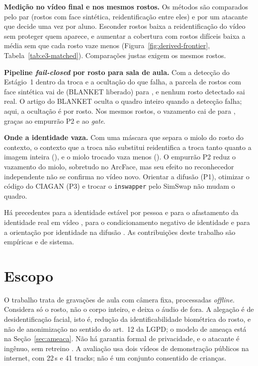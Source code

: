 \textbf{Medição no vídeo final e nos mesmos rostos.} Os métodos são comparados pelo par (rostos com face sintética, reidentificação entre eles) e por um atacante que decide uma vez por aluno. Esconder rostos baixa a reidentificação do vídeo sem proteger quem aparece, e aumentar a cobertura com rostos difíceis baixa a média sem que cada rosto vaze menos (Figura~\ref{fig:derived-frontier}, Tabela~\ref{tab:e3-matched}). Comparações justas exigem os mesmos rostos.

\textbf{Pipeline \emph{fail-closed} por rosto para sala de aula.} Com a detecção do Estágio~1 dentro da troca e a ocultação do que falha, a parcela de rostos com face sintética vai de  (BLANKET liberado) para , e nenhum rosto detectado sai real. O artigo do BLANKET oculta o quadro inteiro quando a detecção falha; aqui, a ocultação é por rosto. Nos mesmos rostos, o vazamento cai de  para , graças ao empurrão P2 e ao \emph{gate}.

\textbf{Onde a identidade vaza.} Com uma máscara que separa o miolo do rosto do contexto, o contexto que a troca não substitui reidentifica a troca tanto quanto a imagem inteira (), e o miolo trocado vaza menos (). O empurrão P2 reduz o vazamento do miolo, sobretudo no ArcFace, mas seu efeito no reconhecedor independente não se confirma no vídeo novo. Orientar a difusão (P1), otimizar o código do CIAGAN (P3) e trocar o \texttt{inswapper} pelo SimSwap não mudam o quadro.

Há precedentes para a identidade estável por pessoa e para o afastamento da identidade real em vídeo \citep{fiva}, para o condicionamento negativo de identidade \citep{nullface,kung,revpers} e para a orientação por identidade na difusão \citep{diffprivacy}. As contribuições deste trabalho são empíricas e de sistema.

\section{Escopo}

O trabalho trata de gravações de aula com câmera fixa, processadas \emph{offline}. Considera só o rosto, não o corpo inteiro, e deixa o áudio de fora. A alegação é de desidentificação facial, isto é, redução da identificabilidade biométrica do rosto, e não de anonimização no sentido do art.~12 da LGPD; o modelo de ameaça está na Seção~\ref{sec:ameaca}. Não há garantia formal de privacidade, e o atacante é ingênuo, sem retreino \citep{hanisch}. A avaliação usa dois vídeos de demonstração públicos na internet, com 22\,s e 41 tracks; não é um conjunto consentido de crianças.

